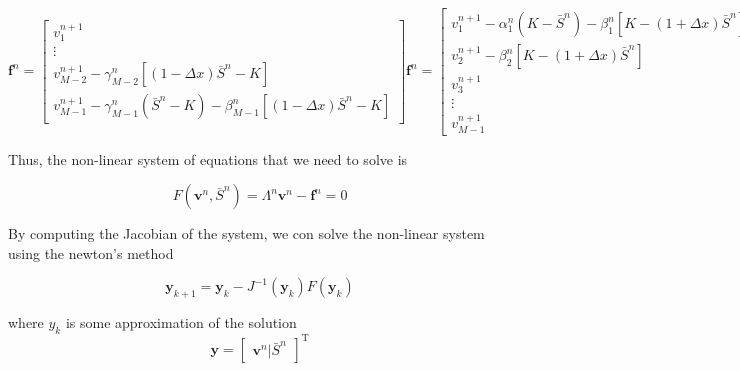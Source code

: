 \begin{subequations}
  \begin{equation}
    \mathbf{f}^n= \begin{bmatrix}
      v^{n+1}_{1} \\
      \vdots \\
      v^{n+1}_{M-2} - \gamma^{n}_{M-2}[(1-\Delta{x})\bar{S}^{n} - K] \\
      v^{n+1}_{M-1} - \gamma^{n}_{M-1}(\bar{S}^n - K) - \beta^{n}_{M-1}[(1-\Delta{x})\bar{S}^{n} - K]
    \end{bmatrix}
  \end{equation}
  \begin{equation}
    \mathbf{f}^n= \begin{bmatrix}
      v^{n+1}_{1} - \alpha^{n}_{1}(K - \bar{S}^{n}) - \beta^{n}_{1}[K - (1+\Delta{x})\bar{S}^{n}] \\
      v^{n+1}_{2} - \beta^{n}_2[K - (1+\Delta{x})\bar{S}^{n}] \\
      v^{n+1}_{3} \\
      \vdots \\
      v^{n+1}_{M-1}
    \end{bmatrix}
  \end{equation}
\end{subequations}

Thus, the non-linear system of equations that we need to solve is

\begin{equation}
  F(\mathbf{v}^{n}, \bar{S}^{n}) = \Lambda^{n}\mathbf{v}^{n} - \mathbf{f}^n = 0
\end{equation}

By computing the Jacobian of the system, we con solve the non-linear system 
using the newton's method

\begin{equation}
  \mathbf{y}_{k+1} = \mathbf{y}_{k} - J^{-1}(\mathbf{y}_{k})F(\mathbf{y}_{k})
\end{equation}

where $y_k$ is some approximation of the solution
\begin{equation}
  \mathbf{y} = \begin{bmatrix}
    \mathbf{v}^{n} | \bar{S}^{n}
  \end{bmatrix}^{\text{T}}
\end{equation}